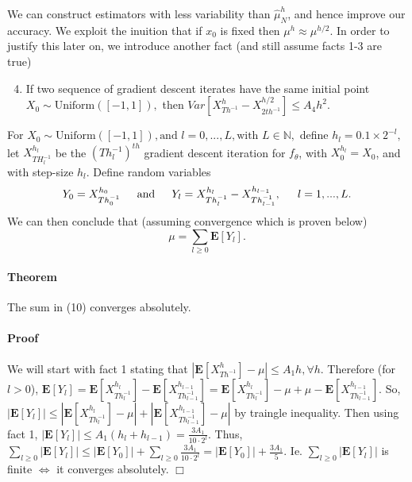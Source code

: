 \documentclass{article}
\begin{document}
We can construct estimators with less variability than $\hat\mu_N^h$, and hence improve our accuracy. We exploit the inuition that if $x_0 $ is fixed then $\mu^h \approx \mu^{h/2}$. In order to justify this later on, we introduce another fact (and still assume facts 1-3 are true)
\begin{enumerate}
\setcounter{enumi}{3}
\item If two sequence of gradient descent iterates have the same initial point $X_0 \sim \text{Uniform}([-1,1]),$ then $Var [ X_{Th^{-1}}^h-X_{2th^{-1}}^{h/2} ] \leq A_4h^2$.
\end{enumerate}
For $X_0 \sim \text{Uniform}([-1,1]), \text{and } l=0,...,L, \text{with } L \in \mathbb{N},$ define $h_l=0.1 \times 2^{-l},$ let $X^{h_l}_{TH^{-1}_l}$ be the $(Th_l^{-1})^{th}$ gradient descent iteration for $f_\theta$, with $X_0^{h_l}=X_0$, and with step-size $h_l$. Define random variables
\begin{equation}
Y_0=X_{Th^{-1}_0}^{h_0} \indent{} \text{and} \indent{} Y_l = X_{Th^{-1}_l}^{h_l}-X_{Th^{-1}_{l-1}}^{h_{l-1}}, \indent{} l=1,...,L.
\end{equation}
We can then conclude that (assuming convergence which is proven below)
\begin{equation}
\mu=\sum_{l \geq 0} \textbf{E}[Y_l].
\end{equation}

\paragraph{Theorem} The sum in (10) converges absolutely.
\paragraph{Proof} We will start with fact 1 stating that $|\textbf{E}[X_{Th^{-1}}^h]-\mu| \leq A_1h, \forall h$. Therefore (for $l>0$), $\textbf{E}[Y_l]=\textbf{E}[ X_{Th^{-1}_l}^{h_l}]- \textbf{E}[X_{Th^{-1}_{l-1}}^{h_{l-1}}] = \textbf{E}[ X_{Th^{-1}_l}^{h_l}]- \mu + \mu - \textbf{E}[X_{Th^{-1}_{l-1}}^{h_{l-1}}]$. So, $|\textbf{E}[Y_l]| \leq |\textbf{E}[ X_{Th^{-1}_l}^{h_l}]- \mu| + | \textbf{E}[X_{Th^{-1}_{l-1}}^{h_{l-1}}]- \mu|$ by traingle inequality. Then using fact 1, $|\textbf{E}[Y_l]| \leq A_1(h_l+h_{l-1})=\frac{3 A_1}{10 \cdot 2^{l}}$. Thus, $\sum_{l \geq 0}|\textbf{E}[Y_l]| \leq |\textbf{E}[Y_0]| + \sum_{l \geq 0} \frac{3 A_1}{10 \cdot 2^{l}}= |\textbf{E}[Y_0]| + \frac{3 A_1}{5}$. Ie. $\sum_{l \geq 0}|\textbf{E}[Y_l]|$  is finite $\iff$ it converges absolutely. \indent{} $\Box{}$
\end{document}
